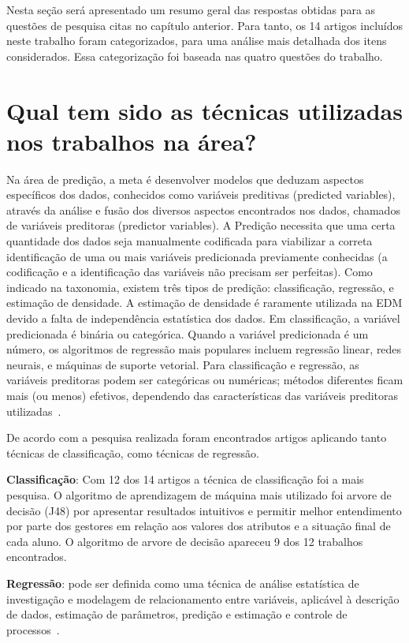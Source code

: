 \documentclass[ti]{texufpel} %
\begin{document}
Nesta seção será apresentado um resumo geral das respostas obtidas para as questões de pesquisa citas no capítulo anterior. Para tanto, os 14 artigos incluídos neste trabalho foram categorizados, para uma análise mais detalhada dos itens considerados. Essa categorização foi baseada nas quatro questões do trabalho.

\section{Qual tem sido as técnicas utilizadas nos trabalhos na área?}

Na área de predição, a meta é desenvolver modelos que deduzam aspectos específicos dos dados, conhecidos como variáveis preditivas (predicted variables), através da análise e fusão dos diversos aspectos encontrados nos dados, chamados de variáveis preditoras (predictor variables). A Predição necessita que uma certa quantidade dos dados seja manualmente codificada para viabilizar a correta identificação de uma ou mais variáveis predicionada previamente conhecidas (a codificação e a identificação das variáveis não precisam ser perfeitas). Como indicado na taxonomia, existem três tipos de predição: classificação, regressão, e estimação de densidade. A estimação de densidade é raramente utilizada na EDM devido a falta de independência estatística dos dados. Em classificação, a variável predicionada é binária ou categórica. Quando a variável predicionada é um número, os algoritmos de regressão mais populares incluem regressão linear, redes neurais, e máquinas de suporte vetorial. Para classificação e regressão, as variáveis preditoras podem ser categóricas ou numéricas; métodos diferentes ficam mais (ou menos) efetivos, dependendo das características das variáveis preditoras utilizadas~\cite{baker2011mineraccao}.

De acordo com a pesquisa realizada foram encontrados artigos aplicando tanto técnicas de classificação, como técnicas de  regressão.

\textbf{Classificação}: Com 12 dos 14 artigos a técnica de classificação foi a mais pesquisa.
O algoritmo de aprendizagem de máquina mais utilizado foi arvore de decisão (J48) por apresentar resultados intuitivos e permitir melhor entendimento por parte dos gestores em relação aos valores dos atributos e a situação final de cada aluno. O algoritmo de arvore de decisão apareceu 9 dos 12 trabalhos encontrados.

\textbf{Regressão}: pode ser definida como uma técnica de análise estatística de investigação e modelagem de relacionamento entre variáveis, aplicável à descrição de dados, estimação de parâmetros, predição e estimação e controle de processos~\cite{de2016mineraccao}.
\end{document}
